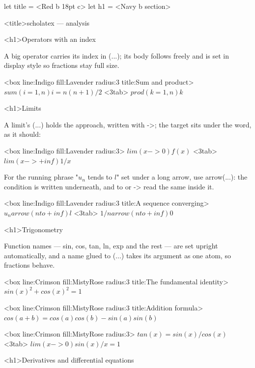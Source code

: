 \documentclass[
  margins=18,
  font=Latin Modern Roman,
  size=12,
  linespread=1.4,
  lang=en
]{scholatex}
\begin{document}
let title = <Red b 18pt c>
let h1    = <Navy b section>

<title>scholatex — analysis

<h1>Operators with an index

A big operator carries its index in (...); its body follows freely
and is set in display style so fractions stay full size.

<box line:Indigo fill:Lavender radius:3 title:{Sum and product}>{
	$sum(i=1, n) i = n(n+1)/2$ <3tab> $prod(k=1, n) k$
}

<h1>Limits

A limit's (...) holds the approach, written with ->; the target
sits under the word, as it should:

<box line:Indigo fill:Lavender radius:3>{
	$lim(x->0) f(x)$ <3tab> $lim(x->+inf) 1/x$
}

For the running phrase "$u_n$ tends to $l$" set under a long arrow, use
arrow(...): the condition is written underneath, and to or ->
read the same inside it.

<box line:Indigo fill:Lavender radius:3 title:{A sequence converging}>{
	$u_n arrow(n to +inf) l$ <3tab> $1/n arrow(n to +inf) 0$
}

<h1>Trigonometry

Function names — sin, cos, tan, ln, exp and
the rest — are set upright automatically, and a name glued to (...)
takes its argument as one atom, so fractions behave.

<box line:Crimson fill:MistyRose radius:3 title:{The fundamental identity}>{
	$sin(x)^2 + cos(x)^2 = 1$
}

<box line:Crimson fill:MistyRose radius:3 title:{Addition formula}>{
	$cos(a+b) = cos(a)cos(b) - sin(a)sin(b)$
}

<box line:Crimson fill:MistyRose radius:3>{
	$tan(x) = sin(x)/cos(x)$ <3tab> $lim(x->0) sin(x)/x = 1$
}

<h1>Derivatives and differential equations
\end{document}
